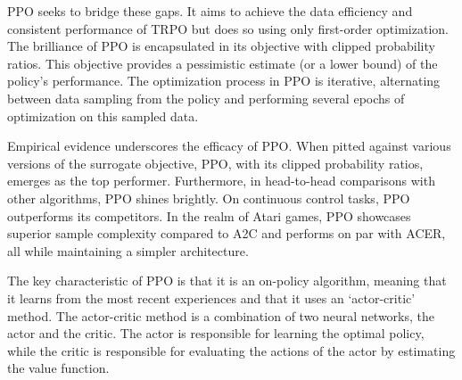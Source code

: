 PPO seeks to bridge these gaps. It aims to achieve the data efficiency and consistent performance of TRPO but does so using only first-order optimization. The brilliance of PPO is encapsulated in its objective with clipped probability ratios. This objective provides a pessimistic estimate (or a lower bound) of the policy's performance. The optimization process in PPO is iterative, alternating between data sampling from the policy and performing several epochs of optimization on this sampled data.

Empirical evidence underscores the efficacy of PPO. When pitted against various versions of the surrogate objective, PPO, with its clipped probability ratios, emerges as the top performer. Furthermore, in head-to-head comparisons with other algorithms, PPO shines brightly. On continuous control tasks, PPO outperforms its competitors. In the realm of Atari games, PPO showcases superior sample complexity compared to A2C and performs on par with ACER, all while maintaining a simpler architecture.

The key characteristic of PPO is that it is an on-policy algorithm, meaning that it learns from the most recent experiences and that it uses an `actor-critic' method. The actor-critic method is a combination of two neural networks, the actor and the critic. The actor is responsible for learning the optimal policy, while the critic is responsible for evaluating the actions of the actor by estimating the value function.  

